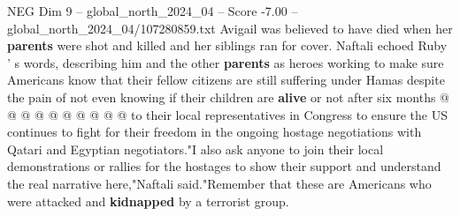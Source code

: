 \begin{textsample}{NEG Dim 9 – global\_north\_2024\_04 – Score -7.00 – global\_north\_2024\_04/107280859.txt}
Avigail was believed to have died when her \textbf{parents} were shot and killed and her siblings ran for cover.
Naftali echoed Ruby ' s words, describing him and the other \textbf{parents} as heroes working to make sure Americans know that their fellow citizens are still suffering under Hamas despite the pain of not even knowing if their children are \textbf{alive} or not after six months @ @ @ @ @ @ @ @ @ @ to their local representatives in Congress to ensure the US continues to fight for their freedom in the ongoing hostage negotiations with Qatari and Egyptian negotiators."I also ask anyone to join their local demonstrations or rallies for the hostages to show their support and understand the real narrative here,"Naftali said."Remember that these are Americans who were attacked and \textbf{kidnapped} by a terrorist group.

\end{textsample}
